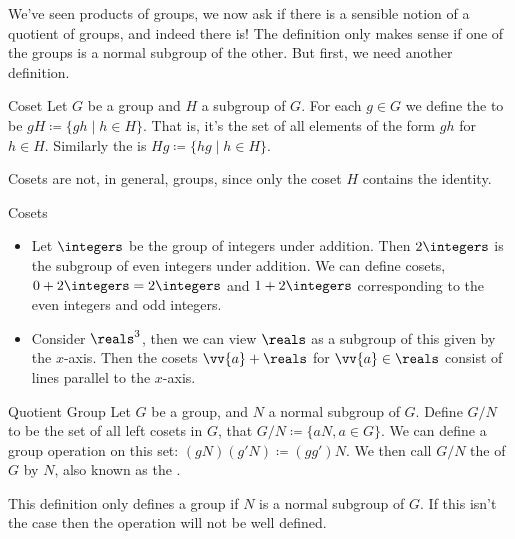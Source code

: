 \documentclass[fleqn]{NotesClass}
\begin{document}
    We've seen products of groups, we now ask if there is a sensible notion of a quotient of groups, and indeed there is!
    The definition only makes sense if one of the groups is a normal subgroup of the other.
    But first, we need another definition.
    \begin{dfn}{Coset}{}
        Let \(G\) be a group and \(H\) a subgroup of \(G\).
        For each \(g \in G\) we define the  to be \(gH \coloneqq \{gh \mid h \in H\}\).
        That is, it's the set of all elements of the form \(gh\) for \(h \in H\).
        Similarly the  is \(Hg \coloneqq \{hg \mid h \in H\}\).
    \end{dfn}
    
    \begin{wrn}
        Cosets are not, in general, groups, since only the coset \(H\) contains the identity.
    \end{wrn}
    
    \begin{exm}{Cosets}{}
        \begin{itemize}
            \item Let \(\integers\) be the group of integers under addition.
            Then \(2\integers\) is the subgroup of even integers under addition.
            We can define cosets, \(0 + 2\integers = 2\integers\) and \(1 + 2\integers\) corresponding to the even integers and odd integers.
            \item Consider \(\reals^3\), then we can view \(\reals\) as a subgroup of this given by the \(x\)-axis.
            Then the cosets \(\vv{a} + \reals\) for \(\vv{a} \in \reals\) consist of lines parallel to the \(x\)-axis.
        \end{itemize}
    \end{exm}
    
    \begin{dfn}{Quotient Group}{}
        Let \(G\) be a group, and \(N\) a normal subgroup of \(G\).
        Define \(G/N\) to be the set of all left cosets in \(G\), that \(G/N \coloneqq \{aN, a \in G\}\).
        We can define a group operation on this set: \((gN)(g'N) \coloneqq (gg')N\).
        We then call \(G/N\) the  of \(G\) by \(N\), also known as the .
    \end{dfn}
    
    \begin{wrn}
        This definition only defines a group if \(N\) is a normal subgroup of \(G\).
        If this isn't the case then the operation will not be well defined.
    \end{wrn}
    
\end{document}
